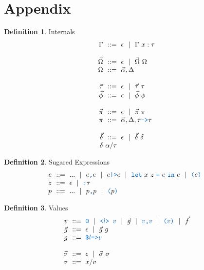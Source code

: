 \documentclass[acmsmall]{acmart}
\theoremstyle{definition}
\newtheorem{definition}{Definition}[section]
\begin{document}
\section{Appendix}
\label{sect:appendix}
\begin{definition} Internals 
  \label{def:internals}
  \[\begin{array}[t]{r@{}l}
    \nonterm{\Gamma} & \is \epsilon \sep \Gamma\ x : \tau
    \\
    \\
    \nonterm{\vec{\Omega}} & \is \epsilon \sep \vec{\Omega}\ \Omega
    \\
    \nonterm{\Omega} & \is \vec{\alpha}, \Delta
    \\
    \\
    \nonterm{\vec{\tau}} & \is \epsilon \sep \vec{\tau}\ \tau
    \\
    \nonterm{\vec{\phi}} & \is \epsilon \sep \vec{\phi}\ \phi
    \\
    \\
    \nonterm{\vec{\pi}} & \is \epsilon \sep \vec{\pi}\ \pi
    \\
    \nonterm{\pi} & \is \vec{\alpha}, \Delta, \tau \obj{->} \tau
    \\
    \\
    \nonterm{\vec{\delta}} & \is \epsilon \sep \vec{\delta}\ \delta
    \\
    \nonterm{\delta} & \alpha \slash \tau
  \end{array}\]
\end{definition}


\begin{definition} Sugared Expressions 
  \label{def:sugared_expressions}
  \[\begin{array}[t]{r@{}l}
    \nonterm{e} & \is 
    \begin{array}[t]{@{}l}
      ... \sep
      e\obj{,}e \sep
      e\obj{|>}e \sep
      \obj{let}\ x\ z\ \obj{=}\ e\ \obj{in}\ e \sep
      \obj{(}e\obj{)}
    \end{array}
    \\
    \nonterm{z} & \is \epsilon \sep \obj{:}\tau 
    \\
    \nonterm{p} & \is 
      ... \sep
      p\obj{,}p \sep
      \obj{(}p\obj{)} 
  \end{array}\]
\end{definition}

\begin{definition} Values 
  \label{def:others}
  \[\begin{array}[t]{r@{}l}
    \nonterm{v} & \is 
      \obj{@} \sep
      \obj{<$l$> $v$} \sep
      \vec{g} \sep
      \obj{$v$,$v$} \sep
      \obj{($v$)} \sep
      \vec{f} 
    \\
    \nonterm{\vec{g}} & \is \epsilon \sep \vec{g}\ g
    \\
    \nonterm{g} & \is \obj{\$$l$=>$v$}
    \\
    \\
    \nonterm{\vec{\sigma}} & \is \epsilon \sep \vec{\sigma}\ \sigma
    \\
    \nonterm{\sigma} & \is x \slash v
  \end{array}\]
\end{definition}
\end{document}
